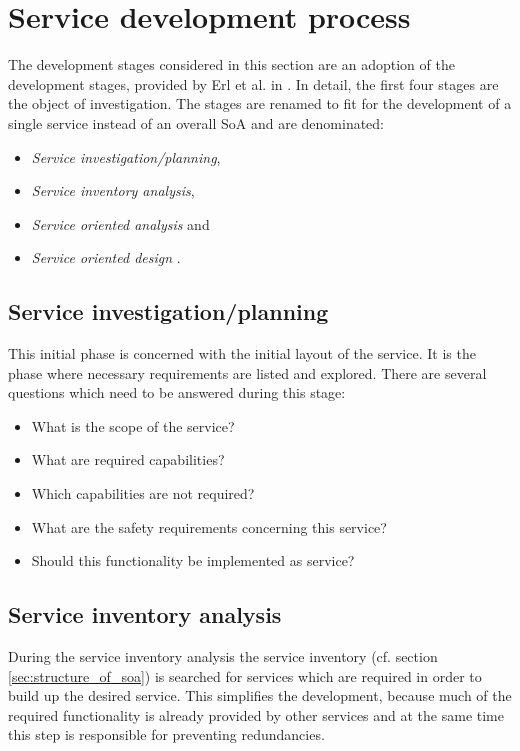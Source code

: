 \section{Service development process}
\label{sec:service-development-process}

The development stages considered in this section are an adoption of the development stages, provided by Erl et al. in \cite[p.116]{erl2011}. In detail, the first four stages are the object of investigation. The stages are renamed to fit for the development of a single service instead of an overall SoA and are denominated:
\begin{itemize}
\item \emph{Service investigation/planning},
\item \emph{Service inventory analysis},
\item \emph{Service oriented analysis} and
\item \emph{Service oriented design} \cite[p.116]{erl2011}.
\end{itemize}


\subsection{Service investigation/planning}
This initial phase is concerned with the initial layout of the service. It is the phase where necessary requirements are listed and explored. There are several questions which need to be answered during this stage:
\begin{itemize}
\item What is the scope of the service?
\item What are required capabilities?
\item Which capabilities are not required?
\item What are the safety requirements concerning this service?
\item Should this functionality be implemented as service?
\end{itemize}



\subsection{Service inventory analysis}

During the service inventory analysis the service inventory (cf. section \ref{sec:structure_of_soa}) is searched for services which are required in order to build up the desired service. This simplifies the development, because much of the required functionality is already provided by other services and at the same time this step is responsible for preventing redundancies.



